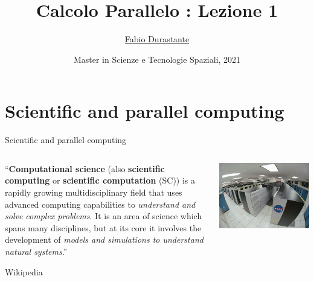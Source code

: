 \documentclass[xcolor={svgnames,usenames}]{beamer}
\title[Calcolo Parallelo]{Calcolo Parallelo : Lezione 1}
\author[F. Durastante]{
    \href{mailto:f.durastante@na.iac.cnr.it}{Fabio Durastante}
}
\institute{Dipartimento di Matematica, Università di Pisa}
\date[Maggio 2021]{Master in Scienze e Tecnologie Spaziali, 2021}
\begin{document}
\begin{frame}
	\titlepage
\end{frame}

\section[Outline]{}
\frame[allowframebreaks]{\tableofcontents}

\section{Scientific and parallel computing}

\begin{frame}{Scientific and parallel computing}

\begin{columns}
	\begin{column}{0.6\textwidth}
		\begin{center}
		``\textbf{Computational science} (also \textbf{scientific computing} or \textbf{scientific computation} (SC)) is a rapidly growing multidisciplinary field that uses advanced computing capabilities to \emph{understand and solve complex problems}. It is an area of science which spans many disciplines, but at its core it involves the development of \emph{models and simulations to understand natural systems}.''
		\end{center}
		
		\flushright Wikipedia
	\end{column}
	\begin{column}{0.4\textwidth}
		\centering
		\includegraphics[width=\columnwidth]{nasasuperpc.jpg}
		
	\end{column}
\end{columns}

\end{frame}
\end{document}
